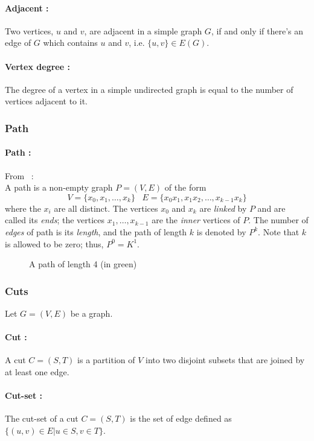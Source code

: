 \paragraph{Adjacent :}
Two vertices, $u$ and $v$, are adjacent in a simple graph $G$, if and only if
there's an edge of $G$ which contains $u$ and $v$, i.e. $\{u,v\} \in E(G)$.

\paragraph{Vertex degree :}
The degree of a vertex in a simple undirected graph is equal to the number of
vertices adjacent to it.

\subsubsection{Path}
\paragraph{Path :}
From~\cite{Diestel} :\\
A path is a non-empty graph $P = (V, E)$ of the form
$$ V = \{x_0,x_1, \dots, x_k \} \;\;\; E=\{x_0x_1, x_1x_2, \dots, x_{k-1}x_k \}$$
where the $x_i$ are all distinct. The vertices $x_0$ and $x_k$ are {\em linked}
by $P$ and are called its {\em ends}; the vertices $x_1, \dots, x_{k-1}$ are the
{\em inner} vertices of $P$. The number of {\em edges} of path is its
{\em length}, and the path of length $k$ is denoted by $P^k$. Note that $k$ is
allowed to be zero; thus, $P^0 = K^1$.

\begin{figure}[!h]
  \begin{center}
    
  \end{center}
  \caption{A path of length 4 (in green)}
\end{figure}

\subsubsection{Cuts}
Let $G=(V,E)$ be a graph.
\paragraph{Cut :}
A cut $C=(S,T)$ is a partition of $V$ into two disjoint subsets that are joined by at least one edge.

\paragraph{Cut-set :}
The cut-set of a cut $C=(S,T)$ is the set of edge defined as $\{(u,v)\in E | u\in S, v \in T\}$.


